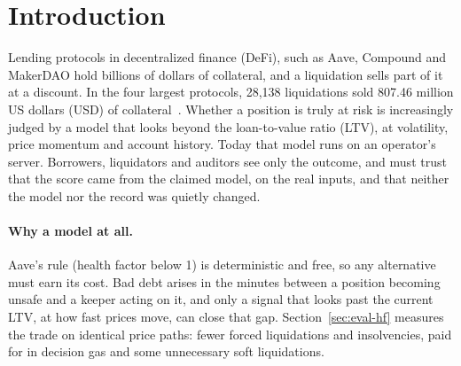 \documentclass[sigconf,nonacm]{acmart}
\begin{document}
\newcommand{\pevmLegacy}{0.55$\times$}
\newcommand{\pevmSingle}{0.84$\times$}
\newcommand{\echidnaCalls}{100,117}
\begin{teaserfigure}
  \centering
  
  \caption{TrustTier in one picture. (a) Lending protocols liquidate only once LTV crosses the threshold, and a risk model that could act earlier runs off-chain, unchecked. (b) TrustTier's contract reads every input itself, computes the distance $\delta$ to the boundary and enforces how strongly each decision must be verified: a zero-knowledge proof near the boundary, cheap bonded claims far from it, with bands that widen for volatile collateral. (c) The result.}
  \label{fig:teaser}
\end{teaserfigure}

\maketitle



\section{Introduction}

Lending protocols in decentralized finance (DeFi), such as Aave, Compound and MakerDAO hold billions of dollars of collateral, and a liquidation sells part of it at a discount. In the four largest protocols, 28,138 liquidations sold 807.46 million US dollars (USD) of collateral~\cite{qin2021liquidations}. Whether a position is truly at risk is increasingly judged by a model that looks beyond the loan-to-value ratio (LTV), at volatility, price momentum and account history. Today that model runs on an operator's server. Borrowers, liquidators and auditors see only the outcome, and must trust that the score came from the claimed model, on the real inputs, and that neither the model nor the record was quietly changed.

\paragraph{Why a model at all.} Aave's rule (health factor below 1) is deterministic and free, so any alternative must earn its cost. Bad debt arises in the minutes between a position becoming unsafe and a keeper acting on it, and only a signal that looks past the current LTV, at how fast prices move, can close that gap. Section~\ref{sec:eval-hf} measures the trade on identical price paths: fewer forced liquidations and insolvencies, paid for in decision gas and some unnecessary soft liquidations.
\end{document}
